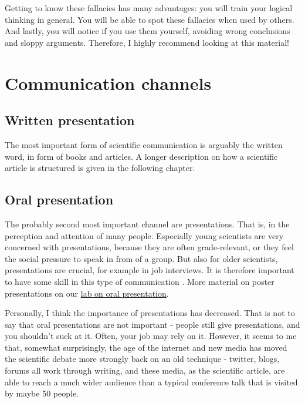 \documentclass{tufte-book}
\begin{document}
Getting to know these fallacies has many advantages: you will train your logical thinking in general. You will be able to spot these fallacies when used by others. And lastly, you will notice if you use them yourself, avoiding wrong conclusions and sloppy arguments. Therefore, I highly recommend looking at this material!


\section{Communication channels}


\subsection{Written presentation}

The most important form of scientific communication is arguably the written word, in form of books and articles. A longer description on how a scientific article is structured is given in the following chapter.

\subsection{Oral presentation}

The probably second most important channel are presentations. That is, in the perception and attention of many people. Especially young scientists are very concerned with presentations, because they are often grade-relevant, or they feel the social pressure to speak in from of a group. But also for older scientists, presentations are crucial, for example in job interviews. It is therefore important to have some skill in this type of communication \citep[see, e.g. the tips of][]{Kelleher-Tenguidelineseffective-2011}. More material on poster presentations on our \href{https://github.com/florianhartig/ResearchSkills/tree/master/Labs/OralPresentation}{lab on oral presentation}.

Personally, I think the importance of presentations has decreased. That is not to say that oral presentations are not important - people still give presentations, and you shouldn't suck at it. Often, your job may rely on it. However, it seems to me that, somewhat surprisingly, the age of the internet and new media has moved the scientific debate more strongly back on an old technique - twitter, blogs, forums all work through writing, and these media, as the scientific article, are able to reach a much wider audience than a typical conference talk that is visited by maybe 50 people.
\end{document}
